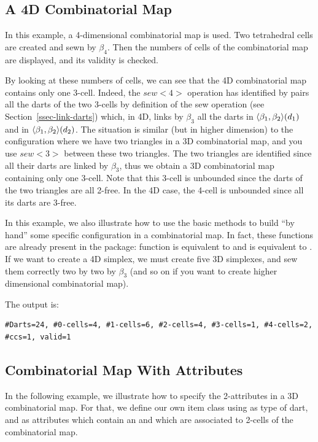 \subsection{A 4D Combinatorial Map}
In this example, a 4-dimensional combinatorial map is used.  Two
tetrahedral cells are created and sewn by $\beta_4$.  Then the numbers
of cells of the combinatorial map are displayed, and its validity is
checked. 

By looking at these numbers of cells, we can see that the 4D
combinatorial map contains only one 3-cell. Indeed, the $sew<4>$
operation has identified by pairs all the darts of the two 3-cells
by definition of the sew operation (see Section~\ref{ssec-link-darts})
which, in 4D, links by $\beta_3$ all the darts in
$\langle{}\beta_{1},\beta_{2}\rangle{}(d_1)$ and in $\langle{}\beta_{1},\beta_{2}\rangle{}(d_2)$.  The
situation is similar (but in higher dimension) to the
configuration where we have two triangles in a 3D combinatorial map,
and you use $sew<3>$ between these two triangles. The two triangles
are identified since all their darts are linked by $\beta_3$, thus we
obtain a 3D combinatorial map containing only one 3-cell. Note that
this 3-cell is unbounded since the darts of the two triangles are all
2-free. In the 4D case, the 4-cell is unbounded since all its darts
are 3-free.

In this example, we also illustrate how to use the basic methods to
build ``by hand'' some specific configuration in a combinatorial
map. In fact, these functions are already present in the package:
function  is equivalent to
 and
 is equivalent to
.  If we want to create a 4D
simplex, we must create five 3D simplexes, and sew them correctly
two by two by $\beta_3$ (and so on if you want to create higher
dimensional combinatorial map).


The output is:
\begin{verbatim}
#Darts=24, #0-cells=4, #1-cells=6, #2-cells=4, #3-cells=1, #4-cells=2, #ccs=1, valid=1
\end{verbatim}

\subsection{Combinatorial Map With Attributes}
\label{ssec-combi-map-with-color}
In the following example, we illustrate how to specify the
2-attributes in a 3D combinatorial map. For that, we define our own
item class using  as type of dart, and
as attributes which contain an  and which are associated to
2-cells of the combinatorial map.


